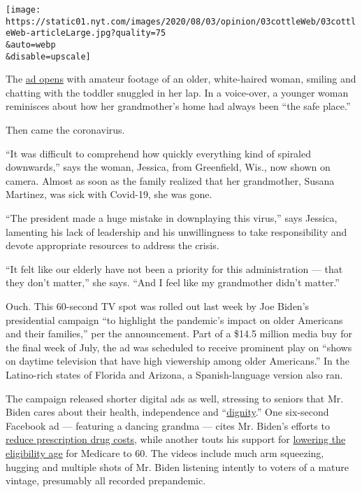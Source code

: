 \texttt{[image: https://static01.nyt.com/images/2020/08/03/opinion/03cottleWeb/03cottleWeb-articleLarge.jpg?quality=75\\\&auto=webp\\\&disable=upscale]}

The
\href{https://www.youtube.com/watch?v=FxT0IFdaaQc\&feature=youtu.be}{ad
opens} with amateur footage of an older, white-haired woman, smiling and
chatting with the toddler snuggled in her lap. In a voice-over, a
younger woman reminisces about how her grandmother's home had always
been ``the safe place.''

Then came the coronavirus.

``It was difficult to comprehend how quickly everything kind of spiraled
downwards,'' says the woman, Jessica, from Greenfield, Wis., now shown
on camera. Almost as soon as the family realized that her grandmother,
Susana Martinez, was sick with Covid-19, she was gone.

``The president made a huge mistake in downplaying this virus,'' says
Jessica, lamenting his lack of leadership and his unwillingness to take
responsibility and devote appropriate resources to address the crisis.

``It felt like our elderly have not been a priority for this
administration --- that they don't matter,'' she says. ``And I feel like
my grandmother didn't matter.''

Ouch. This 60-second TV spot was rolled out last week by Joe Biden's
presidential campaign ``to highlight the pandemic's impact on older
Americans and their families,'' per the announcement. Part of a \$14.5
million media buy for the final week of July, the ad was scheduled to
receive prominent play on ``shows on daytime television that have high
viewership among older Americans.'' In the Latino-rich states of Florida
and Arizona, a Spanish-language version also ran.

The campaign released shorter digital ads as well, stressing to seniors
that Mr. Biden cares about their health, independence and
``\href{https://www.youtube.com/watch?v=8ex_yXPnXJU\&feature=youtu.be}{dignity}.''
One six-second Facebook ad --- featuring a dancing grandma --- cites Mr.
Biden's efforts to
\href{https://www.youtube.com/watch?v=fPisAy6jSXo\&feature=youtu.be}{reduce
prescription drug costs}, while another touts his support for
\href{https://www.youtube.com/watch?v=GafRKUdo1xI\&feature=youtu.be}{lowering
the eligibility age} for Medicare to 60. The videos include much arm
squeezing, hugging and multiple shots of Mr. Biden listening intently to
voters of a mature vintage, presumably all recorded prepandemic.

